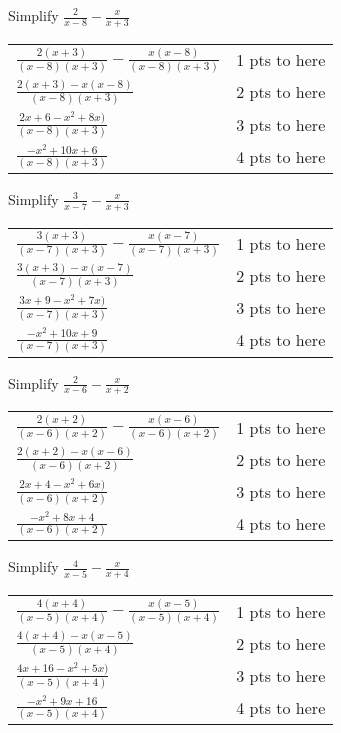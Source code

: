 {
	Simplify $\displaystyle \frac{2}{x-8}-\frac{x}{x+3}$
}
{
	\begin{tabular}{l r}
	$\frac{2(x+3)}{(x-8)(x+3)} - \frac{x(x-8)}{(x-8)(x+3)}$ & 1 pts to here\\
	$\frac{2(x+3)-x(x-8)}{(x-8)(x+3)}$ & 2 pts to here\\
	$\frac{2x+6-x^2+8x)}{(x-8)(x+3)}$ & 3 pts to here\\
	$\frac{-x^2+10x+6}{(x-8)(x+3)}$ & 4 pts to here\\
	\end{tabular}
}

{
	Simplify $\displaystyle \frac{3}{x-7}-\frac{x}{x+3}$
}
{
	\begin{tabular}{l r}
	$\frac{3(x+3)}{(x-7)(x+3)} - \frac{x(x-7)}{(x-7)(x+3)}$ & 1 pts to here\\
	$\frac{3(x+3)-x(x-7)}{(x-7)(x+3)}$ & 2 pts to here\\
	$\frac{3x+9-x^2+7x)}{(x-7)(x+3)}$ & 3 pts to here\\
	$\frac{-x^2+10x+9}{(x-7)(x+3)}$ & 4 pts to here\\
	\end{tabular}
}

{
	Simplify $\displaystyle \frac{2}{x-6}-\frac{x}{x+2}$
}
{
	\begin{tabular}{l r}
	$\frac{2(x+2)}{(x-6)(x+2)} - \frac{x(x-6)}{(x-6)(x+2)}$ & 1 pts to here\\
	$\frac{2(x+2)-x(x-6)}{(x-6)(x+2)}$ & 2 pts to here\\
	$\frac{2x+4-x^2+6x)}{(x-6)(x+2)}$ & 3 pts to here\\
	$\frac{-x^2+8x+4}{(x-6)(x+2)}$ & 4 pts to here\\
	\end{tabular}
}

{
	Simplify $\displaystyle \frac{4}{x-5}-\frac{x}{x+4}$
}
{
	\begin{tabular}{l r}
	$\frac{4(x+4)}{(x-5)(x+4)} - \frac{x(x-5)}{(x-5)(x+4)}$ & 1 pts to here\\
	$\frac{4(x+4)-x(x-5)}{(x-5)(x+4)}$ & 2 pts to here\\
	$\frac{4x+16-x^2+5x)}{(x-5)(x+4)}$ & 3 pts to here\\
	$\frac{-x^2+9x+16}{(x-5)(x+4)}$ & 4 pts to here\\
	\end{tabular}
}
